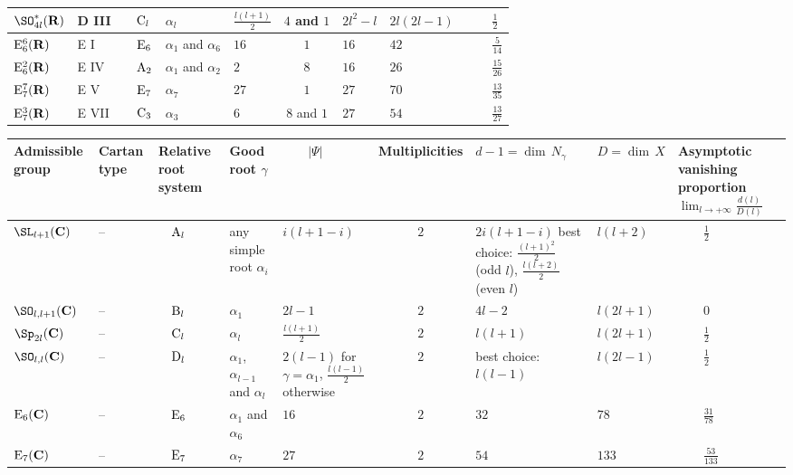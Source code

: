 \begin{landscape}
\begin{tabular}{| M{2cm} || M{1.2cm} | M{1.7cm} | M{1.3cm} | M{2cm} | c | M{2.7cm} | M{2.1cm} | M{2.8cm} |}
${\SO}^*_{4l}({\bf R})$ & D III & $\quad{\rm C}_l$ & $\alpha_l$ & $\frac{l(l+1)}{2}$ & $4$ and $1$ & $2l^2-l$ & $2l(2l-1)$ & $\qquad\frac{1}{2}$ \tabularnewline
\hline

${\rm E}_6^6({\bf R})$ & E I & $\quad{\rm E}_6$ & $\alpha_1$ and $\alpha_6$ & $16$ & $1$ & $16$ & $42$ & $\qquad\frac{5}{14}$ \tabularnewline
\hline

${\rm E}_6^2({\bf R})$ & E IV & $\quad{\rm A}_2$ & $\alpha_1$ and $\alpha_2$ & $2$ & $8$ & $16$ & $26$ & $\qquad\frac{15}{26}$ \tabularnewline
\hline

${\rm E}_7^7({\bf R})$ & E V & $\quad{\rm E}_7$ & $\alpha_7$ & $27$ & $1$ & $27$ & $70$ & $\qquad\frac{13}{35}$ \tabularnewline
\hline

${\rm E}_7^3({\bf R})$ & E VII & $\quad{\rm C}_3$ & $\alpha_3$ & $6$ & $8$ and $1$ & $27$ & $54$ & $\qquad\frac{13}{27}$ \tabularnewline
\hline
\end{tabular}



\begin{tabular}{| M{2cm} || M{1.2cm} | M{1.7cm} | M{1.3cm} | M{2cm} | c | M{2.8cm} | M{2.1cm} | M{2.8cm} |}
\hline

Admissible group & Cartan type & Relative root system & Good root $\gamma$ & $\qquad|\Psi |$ & Multiplicities & $d-1 = {\dim} \, N_\gamma$ & $D = {\dim} \, X$ & Asymptotic vanishing proportion $\displaystyle \lim_{l \to +\infty} \scriptstyle \frac{d(l)}{D(l)}$ \tabularnewline
\hline\hline

${\SL}_{l+1}({\bf C})$ & \quad-- & $\quad{\rm A}_l$ & any simple root $\alpha_i$ & $i(l+1-i)$ & $2$ & $2i(l+1-i)$ best choice: $\frac{(l+1)^2}{2}$ (odd $l$), $\frac{l(l+2)}{2}$ (even $l$) & $\displaystyle l(l+2)$ & $\qquad\frac{1}{2}$ \tabularnewline
\hline

${\SO}_{l,l+1}({\bf C})$ & \quad-- & $\quad{\rm B}_l$ & $\alpha_1$ & $2l-1$ & $2$ & $4l-2$ & $l(2l+1)$ & $\qquad0$ \tabularnewline
\hline

${\Sp}_{2l}({\bf C})$ & \quad-- & $\quad{\rm C}_l$ & $\alpha_l$ & $\frac{l(l+1)}{2}$ & $2$ & $l(l+1)$ & $l(2l+1)$ & $\qquad\frac{1}{2}$ \tabularnewline
\hline

${\SO}_{l,l}({\bf C})$ & \quad-- & $\quad{\rm D}_l$ & $\alpha_1$, $\alpha_{l-1}$ and $\alpha_l$ & $2(l-1)$ for $\gamma = \alpha_1$, $\frac{l(l-1)}{2}$ otherwise & $2$ & best choice: $l(l-1)$ & $l(2l-1)$ & $\qquad\frac{1}{2}$ \tabularnewline
\hline

${\rm E}_6({\bf C})$ & \quad-- & $\quad{\rm E}_6$ & $\alpha_1$ and $\alpha_6$ & $16$ & $2$ & $32$ & $78$ & $\qquad\frac{31}{78}$ \tabularnewline
\hline

${\rm E}_7({\bf C})$ & \quad-- & $\quad{\rm E}_7$ & $\alpha_7$ & $27$ & $2$ & $54$ & $133$ & $\qquad\frac{53}{133}$ \tabularnewline
\hline
\end{tabular}
\end{landscape}



